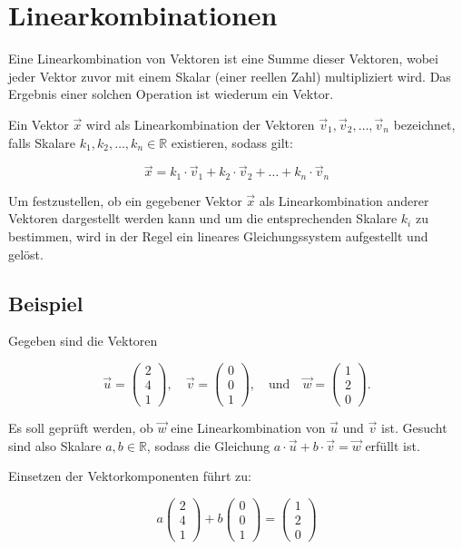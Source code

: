 \chapter{Linearkombinationen}

Eine Linearkombination von Vektoren ist eine Summe dieser Vektoren, wobei jeder
Vektor zuvor mit einem Skalar (einer reellen Zahl) multipliziert wird. Das
Ergebnis einer solchen Operation ist wiederum ein Vektor.

Ein Vektor $\vec{x}$ wird als Linearkombination der Vektoren $\vec{v}_1,
    \vec{v}_2, \ldots, \vec{v}_n$ bezeichnet, falls Skalare $k_1, k_2, \ldots, k_n
    \in \mathbb{R}$ existieren, sodass gilt:

\[
    \vec{x} = k_1 \cdot \vec{v}_1 + k_2 \cdot \vec{v}_2 + \ldots + k_n \cdot \vec{v}_n
\]

Um festzustellen, ob ein gegebener Vektor $\vec{x}$ als Linearkombination
anderer Vektoren dargestellt werden kann und um die entsprechenden Skalare
$k_i$ zu bestimmen, wird in der Regel ein lineares Gleichungssystem aufgestellt
und gelöst.

\section{Beispiel}

Gegeben sind die Vektoren

\[
    \vec{u} = \begin{pmatrix} 2 \\ 4 \\ 1 \end{pmatrix}, \quad \vec{v} = \begin{pmatrix} 0 \\ 0 \\ 1 \end{pmatrix}, \quad \text{und} \quad \vec{w} = \begin{pmatrix} 1 \\ 2 \\ 0 \end{pmatrix}.
\]

Es soll geprüft werden, ob $\vec{w}$ eine Linearkombination von $\vec{u}$ und
$\vec{v}$ ist. Gesucht sind also Skalare $a, b \in \mathbb{R}$, sodass die
Gleichung $a \cdot \vec{u} + b \cdot \vec{v} = \vec{w}$ erfüllt ist.

Einsetzen der Vektorkomponenten führt zu:

\[
    a \begin{pmatrix} 2 \\ 4 \\ 1 \end{pmatrix} + b \begin{pmatrix} 0 \\ 0 \\ 1 \end{pmatrix} = \begin{pmatrix} 1 \\ 2 \\ 0 \end{pmatrix}
\]

